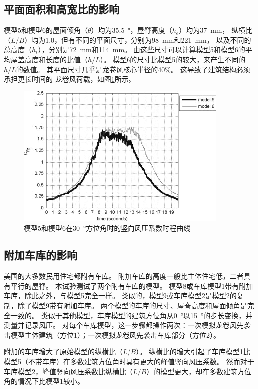 \documentclass{ctexart}
\begin{document}
\subsection{平面面积和高宽比的影响}
模型5和模型6的屋面倾角（$\theta$）均为\SI{35.5}{\degree}，屋脊高度（$h_e$）均为\SI{37}{mm}，
纵横比（$L/B$）均为\num{1.0}，但有不同的平面尺寸，分别为\SI{98}{mm}和\SI{221}{mm}，
以及不同的总高度（$h_t$），分别是\SI{72}{mm}和\SI{114}{mm}。
由这些尺寸可以计算模型5和模型6的平均屋盖高度和长度的比值（$h/L$）。
模型6的尺寸比模型5的较大，来产生不同的$h/L$的数值。
其平面尺寸几乎是龙卷风核心半径的$40\%$。
这导致了建筑结构必须承担更长时间的 龙卷风荷载，如图\ref{fig:13}所示。
\begin{figure}
\centering
\includegraphics{./fig/13.jpg}
\caption{模型5和模型6在\SI{30}{\degree}方位角时的竖向风压系数时程曲线}
\label{fig:13}
\end{figure}

\subsection{附加车库的影响}
美国的大多数民用住宅都附有车库。
附加车库的高度一般比主体住宅低，二者具有平行的屋脊。
本试验测试了两个附有车库的模型。
模型8或车库模型1带有附加车库，除此之外，与模型5完全一样。
类似的，模型9或车库模型2是模型2的复制，除了模型9带有附加车库。
两个模型的车库的尺寸、屋脊高度和屋面倾角是完全一致的。
类似于其他模型，车库模型的建筑方位角从\SI{0}{\degree}以\SI{15}{\degree}的步长变换，并测量并记录风压。
对每个车库模型，这一步骤都操作两次：一次模拟龙卷风先袭击模型主体建筑（方位1）；一次模拟龙卷风先袭击车库部分（方位2）。

附加的车库增大了原始模型的纵横比（$L/B$）。
纵横比的增大引起了车库模型1比模型5（不带车库）在多数建筑方位角时具有更大的峰值竖向风压系数。
然而对于车库模型2，峰值竖向风压系数比纵横比（$L/B$）的模型更大，却在多数建筑方位角的情况下比模型1较小。
\end{document}

